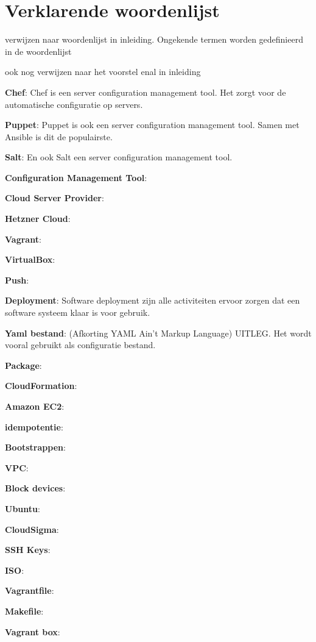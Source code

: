 \chapter{Verklarende woordenlijst}
verwijzen naar woordenlijst in inleiding. Ongekende termen worden gedefinieerd in de woordenlijst

ook nog verwijzen naar het voorstel enal in inleiding

\textbf{Chef}: Chef is een server configuration management tool. Het zorgt voor de automatische configuratie op servers.  

\textbf{Puppet}: Puppet is ook een server configuration management tool. Samen met Ansible is dit de populairste.   

\textbf{Salt}: En ook Salt een server configuration management tool. 

\textbf{Configuration Management Tool}:

\textbf{Cloud Server Provider}:

\textbf{Hetzner Cloud}:


\textbf{Vagrant}:

\textbf{VirtualBox}:

\textbf{Push}:

\textbf{Deployment}: Software deployment zijn alle activiteiten ervoor zorgen dat een software systeem klaar is voor gebruik.

\textbf{Yaml bestand}: (Afkorting YAML Ain't Markup Language) UITLEG. Het wordt vooral gebruikt als configuratie bestand.

\textbf{Package}:

\textbf{CloudFormation}:

\textbf{Amazon EC2}:

\textbf{idempotentie}:

\textbf{Bootstrappen}:

\textbf{VPC}:

\textbf{Block devices}:

\textbf{Ubuntu}:

\textbf{CloudSigma}:

\textbf{SSH Keys}:

\textbf{ISO}:

\textbf{Vagrantfile}:

\textbf{Makefile}:

\textbf{Vagrant box}: